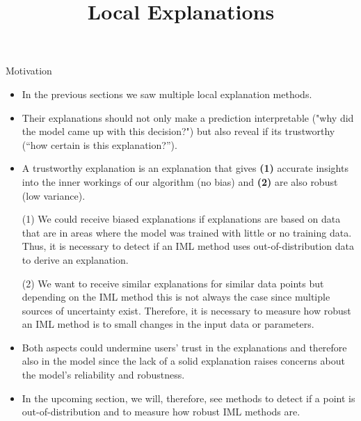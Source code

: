 \documentclass[11pt,compress,t,notes=noshow, xcolor=table]{beamer}
\title{Local Explanations}
\institute{\href{https://compstat-lmu.github.io/lecture_i2ml/}{compstat-lmu.github.io/lecture\_i2ml}}
\date{}
\begin{document}
	










\begin{vbframe}{Motivation}
	\begin{itemize}
		\item In the previous sections we saw multiple local explanation methods. 
		\item Their explanations should not only make a prediction interpretable ("why did the model came up with this decision?") but also reveal if its trustworthy (``how certain is this explanation?'').
		\item A trustworthy explanation is an explanation that gives \textbf{(1)} accurate insights into the inner workings of our algorithm (no bias) and \textbf{(2)} are also robust (low variance). 
		\item[(1)] We could receive biased explanations if explanations are based on data that are in areas where the model was trained with little or no training data. Thus, it is necessary to detect if an IML method uses out-of-distribution data to derive an explanation. 
		\item[(2)] We want to receive similar explanations for similar data points but depending on the IML method this is not always the case since multiple sources of uncertainty exist. Therefore, it is necessary to measure how robust an IML method is to small changes in the input data or parameters. 
		\item Both aspects could undermine users' trust in the explanations and therefore also in the model since the lack of a solid explanation raises concerns about the model's reliability and robustness. 
		\item In the upcoming section, we will, therefore, see methods to detect if a point is out-of-distribution and to measure how robust IML methods are.
	\end{itemize}
\end{vbframe}
\end{document}
